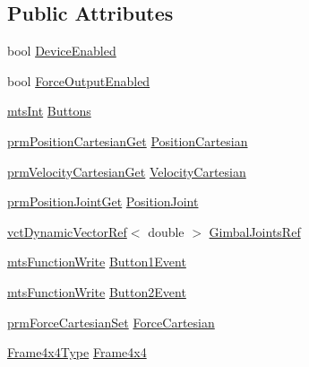 \subsection*{Public Attributes}
\begin{DoxyCompactItemize}
\item 
bool \hyperlink{structmts_sensable_h_d_1_1_device_data_a7c583a0171cbf2cffd0098c25496fd44}{Device\-Enabled}
\item 
bool \hyperlink{structmts_sensable_h_d_1_1_device_data_aa1a01c751b9d1de7d9e8b36bd6b734a0}{Force\-Output\-Enabled}
\item 
\hyperlink{mts_generic_object_proxy_8h_a24374d6f6591267740de73ba87c08d4e}{mts\-Int} \hyperlink{structmts_sensable_h_d_1_1_device_data_ab66d3995932ca9253743a231dea8fd39}{Buttons}
\item 
\hyperlink{classprm_position_cartesian_get}{prm\-Position\-Cartesian\-Get} \hyperlink{structmts_sensable_h_d_1_1_device_data_a4d969029290b854322a3c4f4f94e37c8}{Position\-Cartesian}
\item 
\hyperlink{classprm_velocity_cartesian_get}{prm\-Velocity\-Cartesian\-Get} \hyperlink{structmts_sensable_h_d_1_1_device_data_a2878f540b39f0f5bce4ad8e82f446fdf}{Velocity\-Cartesian}
\item 
\hyperlink{classprm_position_joint_get}{prm\-Position\-Joint\-Get} \hyperlink{structmts_sensable_h_d_1_1_device_data_a3c3a873384119db3e76de8b622240193}{Position\-Joint}
\item 
\hyperlink{classvct_dynamic_vector_ref}{vct\-Dynamic\-Vector\-Ref}$<$ double $>$ \hyperlink{structmts_sensable_h_d_1_1_device_data_ab0dc17f798dd5a4509031b4f12f42b87}{Gimbal\-Joints\-Ref}
\item 
\hyperlink{classmts_function_write}{mts\-Function\-Write} \hyperlink{structmts_sensable_h_d_1_1_device_data_a9d5eb167f38e79ef41f510177b19a292}{Button1\-Event}
\item 
\hyperlink{classmts_function_write}{mts\-Function\-Write} \hyperlink{structmts_sensable_h_d_1_1_device_data_a2bebe1f4ce8c48a720dc982a42eee385}{Button2\-Event}
\item 
\hyperlink{classprm_force_cartesian_set}{prm\-Force\-Cartesian\-Set} \hyperlink{structmts_sensable_h_d_1_1_device_data_a78fa11b960c040001da25a38887327be}{Force\-Cartesian}
\item 
\hyperlink{structmts_sensable_h_d_1_1_device_data_a46ac85be135ad15c04fbe2b06a689781}{Frame4x4\-Type} \hyperlink{structmts_sensable_h_d_1_1_device_data_acfdea4e1ea34ce4887c3ccee27ecd437}{Frame4x4}
\item 

\end{DoxyCompactItemize}
